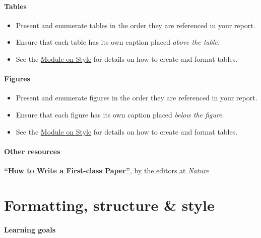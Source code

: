 \documentclass[
]{book}
\begin{document}
\hypertarget{tables}{%
\subsubsection*{Tables}\label{tables}}

\begin{itemize}
\item
  Present and enumerate tables in the order they are referenced in your report.
\item
  Ensure that each table has its own caption placed \emph{above the table}.
\item
  See the \protect\hyperlink{style}{Module on Style} for details on how to create and format tables.
\end{itemize}

\hypertarget{figures}{%
\subsubsection*{Figures}\label{figures}}

\begin{itemize}
\item
  Present and enumerate figures in the order they are referenced in your report.
\item
  Ensure that each figure has its own caption placed \emph{below the figure}.
\item
  See the \protect\hyperlink{style}{Module on Style} for details on how to create and format tables.
\end{itemize}

\hypertarget{other-resources-3}{%
\subsubsection*{Other resources}\label{other-resources-3}}

\href{https://www.nature.com/articles/d41586-018-02404-4}{\textbf{``How to Write a First-class Paper''}, by the editors at \emph{Nature}}

\hypertarget{style}{%
\chapter{Formatting, structure \& style}\label{style}}

\hypertarget{learning-goals-23}{%
\subsubsection*{Learning goals}\label{learning-goals-23}}
\end{document}
